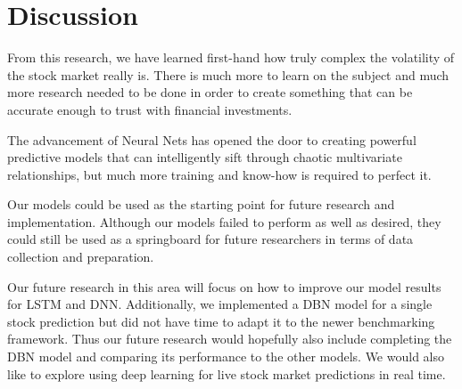 \documentclass[conference]{IEEEtran}
\begin{document}
\FloatBarrier
\section{Discussion}

From this research, we have learned first-hand how truly complex the volatility of the stock market really is.
There is much more to learn on the subject and much more research needed to be done in order to create something that can be accurate enough to trust with financial investments.

The advancement of Neural Nets has opened the door to creating powerful predictive models that can intelligently sift through chaotic multivariate relationships, but much more training and know-how is required to perfect it.

Our models could be used as the starting point for future research and implementation.
Although our models failed to perform as well as desired, they could still be used as a springboard for future researchers in terms of data collection and preparation.

Our future research in this area will focus on how to improve our model results for LSTM and DNN.
Additionally, we implemented a DBN model for a single stock prediction but did not have time to adapt it to the newer benchmarking framework.
Thus our future research would hopefully also include completing the DBN model and comparing its performance to the other models.
We would also like to explore using deep learning for live stock market predictions in real time.



\end{document}
